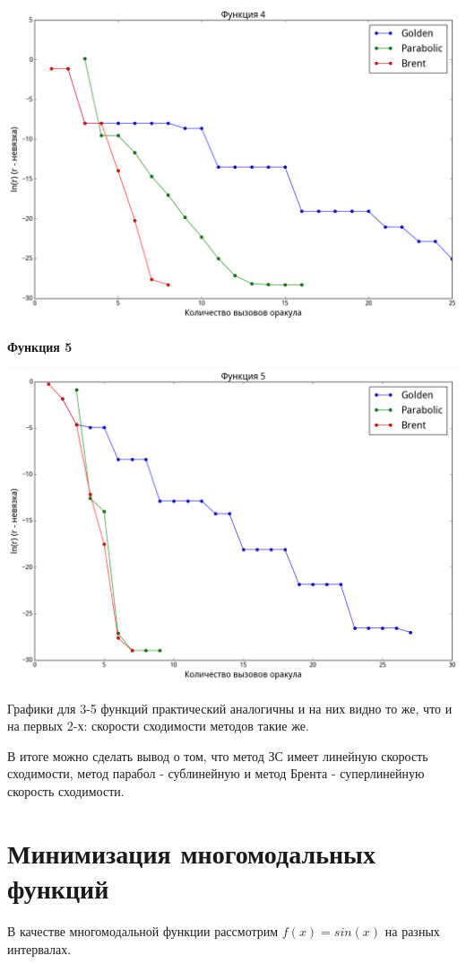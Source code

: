\documentclass[12pt, a4paper]{article}
\begin{document}
        \includegraphics[width=\picwidth]{pics/fun4_nonder.png}

        \textbf{Функция 5}

        \includegraphics[width=\picwidth]{pics/fun5_nonder.png}

        Графики для 3-5 функций практический аналогичны и на них видно то же, что и на первых 2-х: скорости сходимости методов такие же.

        В итоге можно сделать вывод о том, что метод ЗС имеет линейную скорость сходимости, метод парабол - сублинейную и метод Брента - суперлинейную скорость сходимости.


    \section{Минимизация многомодальных функций}
        В качестве многомодальной функции рассмотрим $f(x) = sin(x)$ на разных интервалах.
\end{document}
